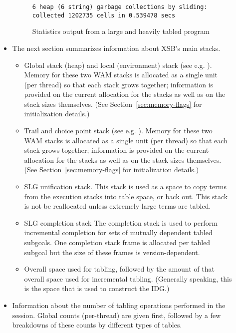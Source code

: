 \begin{description}
\begin{itemize}
\begin{figure}[p]
{\begin{verbatim}
6 heap (6 string) garbage collections by sliding: collected 1202735 cells in 0.539478 secs

\end{verbatim}} 
\caption{Statistics output from a large and heavily tabled program}
\end{figure}

\item The next section summarizes information about XSB's main stacks.

\begin{itemize} 
\item Global stack (heap) and local (environment) stack (see e.g.
  \cite{AitK90}).
  Memory for these two WAM stacks is
  allocated as a single unit (per thread) so that each stack grows
  together; information is provided on the current allocation for the
  stacks as well as on the stack sizes themselves.  (See
  Section~\ref{sec:memory-flags} for initialization details.)
%
\item Trail and choice point stack (see e.g. \cite{AitK90}).
 Memory for these two WAM stacks is allocated as a
 single unit (per thread) so that each stack grows together;
 information is provided on the current allocation for the stacks as
 well as on the stack sizes themselves.  (See
 Section~\ref{sec:memory-flags} for initialization details.)
%
\item SLG unification stack.
  This stack is used as a space to copy terms from the execution
  stacks into table space, or back out.  This stack is not be
  reallocated unless extremely large terms are tabled.
%
\item SLG completion stack
  The completion
  stack is used to perform incremental completion for sets of mutually
  dependent tabled subgoals.  One completion stack frame is allocated
  per tabled subgoal \cite{SaSw98} but the size of these frames is
  version-dependent.
%
\item Overall space used for tabling, followed by the amount of that
  overall space used for incremental tabling.  (Generally speaking,
  this is the space that is used to construct the IDG.)
\end{itemize}

\item Information about the number of tabling operations performed in
  the session.
  Global counts (per-thread) are given
 first, followed by a few breakdowns of these counts by different
 types of tables.


\end{itemize}
\end{description}
